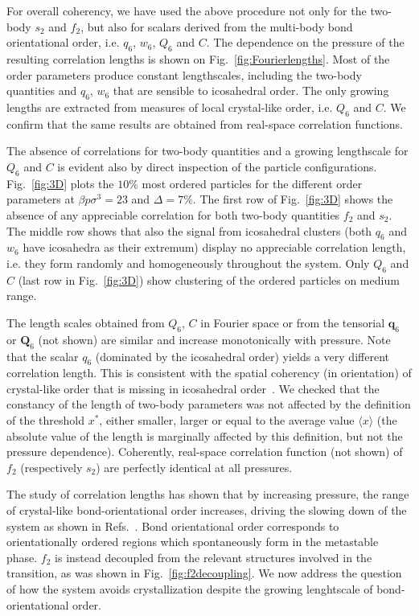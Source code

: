 \documentclass[twocolumn,superscriptaddress]{revtex4}
\begin{document}
For overall coherency, we have used the above procedure not only for the two-body $s_2$ and $f_2$, but also for scalars derived from the multi-body bond orientational order, i.e. $q_6$, $w_6$, $Q_6$ and $C$. The dependence on the pressure of the resulting correlation lengths is shown on Fig.~\ref{fig:Fourierlengths}. Most of the order parameters produce constant lengthscales, including the two-body quantities and $q_6$, $w_6$ that are sensible to icosahedral order. The only growing lengths are extracted from measures of local crystal-like order, i.e. $Q_6$ and $C$. We confirm that the same results are obtained from real-space correlation functions.

The absence of correlations for two-body quantities and a growing lengthscale for $Q_6$ and $C$ is evident also by direct inspection of the particle configurations.
Fig.~\ref{fig:3D} plots the $10\%$ most ordered particles for the different order parameters at $\beta p\sigma^3=23$ and $\Delta=7\%$. The first row of Fig.~\ref{fig:3D} shows the absence of any
appreciable correlation for both two-body quantities $f_2$ and $s_2$. The middle row shows that also the signal from icosahedral clusters
(both $q_6$ and $w_6$ have icosahedra as their extremum) display no appreciable correlation length, i.e. they form randomly and homogeneously throughout the system. 
Only $Q_6$ and $C$ (last row in Fig.~\ref{fig:3D}) show clustering of the ordered particles on medium range.

The length scales obtained from $Q_6$, $C$ in Fourier space or from the tensorial $\mathbf{q}_6$ or $\mathbf{Q}_6$ (not shown) are similar and increase monotonically with pressure. Note that the scalar $q_6$ (dominated by the icosahedral order) yields a very different correlation length. This is consistent with the spatial coherency (in orientation) of crystal-like order that is missing in icosahedral order~\cite{tanaka,mathieu_icosahedra}. We checked that the constancy of the length of two-body parameters was not affected by the definition of the threshold $x^*$, either smaller, larger or equal to the average value $\langle x\rangle$ (the absolute value of the length is marginally affected by this definition, but not the pressure dependence). Coherently, real-space correlation function (not shown) of $f_2$ (respectively $s_2$) are perfectly identical at all pressures.

The study of correlation lengths has shown that by increasing pressure, the range of
crystal-like bond-orientational order increases, driving the slowing down of the system as shown in Refs.~\cite{tanaka,mathieu_icosahedra}. 
Bond orientational order corresponds to
orientationally ordered regions which spontaneously form in the metastable phase.
$f_2$ is instead decoupled from the relevant structures involved in the transition, as
was shown in Fig.~\ref{fig:f2decoupling}. We now address the question of how the system avoids crystallization
despite the growing lenghtscale of bond-orientational order.
\end{document}
